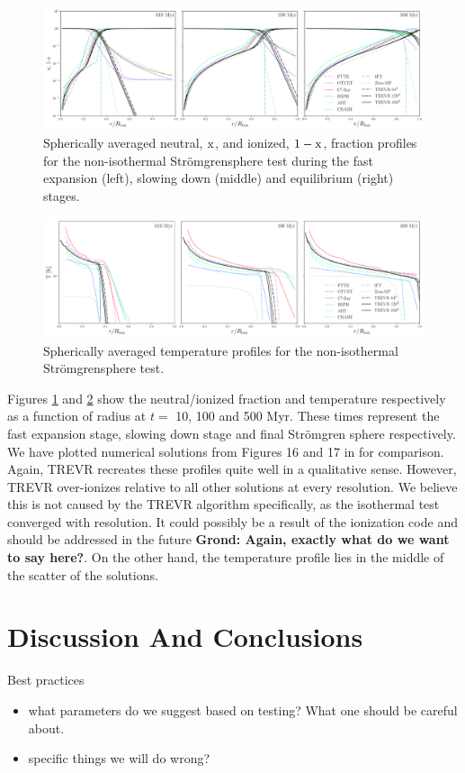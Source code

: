 \documentclass[fleq,usenatbib]{mnras}
\newcommand{\acro}{TREVR}
\newcommand{\comment}[1]{\textbf{\color{red}#1}}
\newcommand{\strom}{Str\"omgren}
\begin{document}
\begin{figure}
\includegraphics[width=0.95\linewidth]{Figures/strom_fraction.pdf}
\caption{Spherically averaged neutral, $\rm x$, and ionized, $\rm 1-x$, 
fraction profiles for the non-isothermal \strom sphere test during the fast 
expansion (left), slowing down (middle) and equilibrium (right) stages.}
\label{fig:stromtherm}
\end{figure}
\begin{figure}
\includegraphics[width=0.95\linewidth]{Figures/strom_temp.pdf}
\caption{Spherically averaged temperature profiles for the non-isothermal 
\strom sphere test.}
\label{fig:stromtemp}
\end{figure}
Figures \ref{fig:stromtherm} and \ref{fig:stromtemp} show the neutral/ionized 
fraction and temperature respectively as a function of radius at $t=$ 10, 100
and 500 Myr. These times represent the fast expansion stage, slowing down 
stage and final \strom{} sphere respectively. We have plotted numerical 
solutions from Figures 16 and 17 in \cite{ilievEt06} for comparison. Again, 
\acro{} recreates these profiles quite well in a qualitative sense. However, 
\acro{} over-ionizes relative to all other solutions at every resolution. We 
believe this is not caused by the \acro{} algorithm specifically, as the 
isothermal test converged with resolution. It could possibly be a result of 
the ionization code and should be addressed in the future \comment{Grond:
Again, exactly what do we want to say here?}. On the other hand, the 
temperature profile lies in the middle of the scatter of the \cite{ilievEt06} 
solutions.


\section{Discussion And Conclusions}\label{sec:disc}
\noindent Best practices
\begin{itemize}
\item what parameters do we suggest based on testing? What one should be 
careful about.
\item specific things we will do wrong?
\end{itemize}
\end{document}
